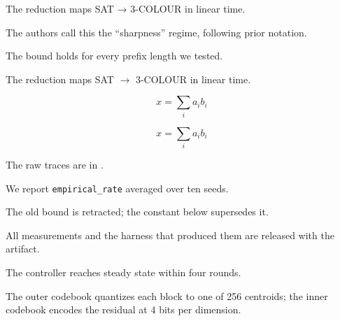 
The reduction maps SAT → 3-COLOUR in linear time.

The authors call this the “sharpness” regime, following prior notation.

The bound holds for every prefix length we tested.

The reduction maps SAT $\rightarrow$ 3-COLOUR in linear time.

$$ x = \sum_i a_i b_i $$

\begin{equation} x = \sum_i a_i b_i \end{equation}

The raw traces are in .

We report \texttt{empirical\_rate} averaged over ten seeds.

The old bound is retracted; the constant below supersedes it.

All measurements and the harness that produced them are released with the artifact.

The controller reaches steady state within four rounds.


The outer codebook quantizes each block to one of 256 centroids; the inner codebook encodes the residual at 4 bits per dimension.

